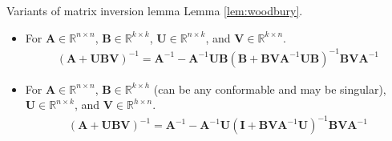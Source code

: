 \begin{lemma}\label{lem:woodburyvar}
    Variants of matrix inversion lemma Lemma \ref{lem:woodbury}. 
    \begin{itemize}
        \item For $\mathbf{A}\in\mathbb{R}^{n\times n}$, $\mathbf{B}\in\mathbb{R}^{k\times k}$, 
        $\mathbf{U}\in\mathbb{R}^{n\times k}$, and $\mathbf{V}\in\mathbb{R}^{k\times n}$.
        \begin{gather}
            (\mathbf{A}+\mathbf{UBV})^{-1} 
            = \mathbf{A}^{-1} 
            - \mathbf{A}^{-1}\mathbf{UB}(
                \mathbf{B}
                + \mathbf{BVA}^{-1}\mathbf{UB}
            )^{-1}\mathbf{BVA}^{-1}
        \end{gather}

        \item For $\mathbf{A}\in\mathbb{R}^{n\times n}$, 
        $\mathbf{B}\in\mathbb{R}^{k\times h}$ (can be any conformable and may be singular), 
        $\mathbf{U}\in\mathbb{R}^{n\times k}$, and $\mathbf{V}\in\mathbb{R}^{h\times n}$.
        \begin{gather}
            (\mathbf{A}+\mathbf{UBV})^{-1} 
            = \mathbf{A}^{-1} 
            - \mathbf{A}^{-1}\mathbf{U}(
                \mathbf{I}
                + \mathbf{BVA}^{-1}\mathbf{U}
            )^{-1}\mathbf{BVA}^{-1}
        \end{gather}
    \end{itemize}
    
    
\end{lemma}

